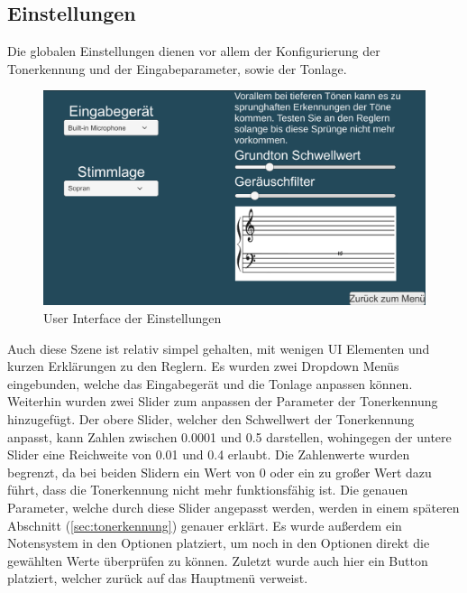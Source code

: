 \newpage

\subsection*{Einstellungen}
Die globalen Einstellungen dienen vor allem der Konfigurierung der Tonerkennung und der Eingabeparameter, sowie der Tonlage. 
\begin{figure}[H]
    \centering
    \includegraphics[width=1\textwidth]{Bilder/optionen.png}
    \caption{User Interface der Einstellungen}
    \label{sec:hps_algo}
\end{figure}
Auch diese Szene ist relativ simpel gehalten, mit wenigen UI Elementen und kurzen Erklärungen zu den Reglern. Es wurden zwei Dropdown Menüs eingebunden, welche das Eingabegerät und die Tonlage anpassen können. Weiterhin wurden zwei Slider zum anpassen der Parameter der Tonerkennung hinzugefügt. Der obere Slider, welcher den Schwellwert der Tonerkennung anpasst, kann Zahlen zwischen 0.0001 und 0.5 darstellen, wohingegen der untere Slider eine Reichweite von 0.01 und 0.4 erlaubt. Die Zahlenwerte wurden begrenzt, da bei beiden Slidern ein Wert von 0 oder ein zu großer Wert dazu führt, dass die Tonerkennung nicht mehr funktionsfähig ist. Die genauen Parameter, welche durch diese Slider angepasst werden, werden in einem späteren Abschnitt (\ref{sec:tonerkennung}) genauer erklärt. Es wurde außerdem ein Notensystem in den Optionen platziert, um noch in den Optionen direkt die gewählten Werte überprüfen zu können. Zuletzt wurde auch hier ein Button platziert, welcher zurück auf das Hauptmenü verweist. 

\newpage

